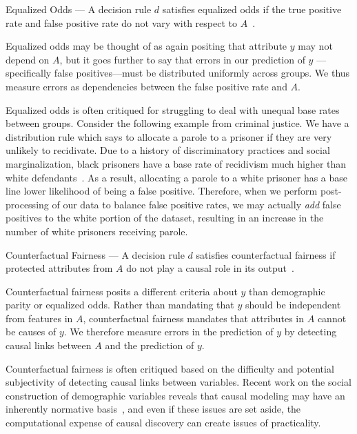 \begin{definition}
    Equalized Odds — A decision rule $d$ satisfies equalized odds if the
    true positive rate and false positive rate do not vary with respect to
    $A$~\cite{Hardt_2016}.
\end{definition}

Equalized odds may be thought of as again positing that attribute $y$ may not
depend on $A$, but it goes further to say that errors in our prediction of $y$
— specifically false positives—must be distributed uniformly across groups. 
We thus measure errors as dependencies between the false positive rate and
$A$.

Equalized odds is often critiqued for struggling to deal with unequal base rates
between groups. Consider the following example from criminal justice. We have a 
distribution rule which says to allocate a parole to a prisoner if they are very
unlikely to recidivate. Due to a history of discriminatory practices and social
marginalization, black prisoners have a base rate of recidivism much higher than
white defendants~\cite{CrimeJustice_2023}. As a result, allocating a parole to 
a white prisoner has a base line lower likelihood of being a false positive. 
Therefore, when we perform post-processing of our data to balance false positive
rates, we may actually \textit{add} false positives to the white portion of the
dataset, resulting in an increase in the number of white prisoners receiving
parole.

\begin{definition}
    Counterfactual Fairness — A decision rule $d$ satisfies counterfactual
    fairness if protected attributes from $A$ do not play a causal role in its
    output~\cite{Kusner_2018}.
\end{definition}

Counterfactual fairness posits a different criteria about $y$ than demographic
parity or equalized odds. Rather than mandating that $y$ should be independent
from features in $A$, counterfactual fairness mandates that attributes in $A$ 
cannot be causes of $y$. We therefore measure errors in the prediction of $y$ by
detecting causal links between $A$ and the prediction of $y$.

Counterfactual fairness is often critiqued based on the difficulty and potential
subjectivity of detecting causal links between variables. Recent work on the 
social construction of demographic variables reveals that causal modeling may 
have an inherently normative basis~\cite{Hu_Forthcoming}, and even if these
issues are set aside, the computational expense of causal discovery can create
issues of practicality.

